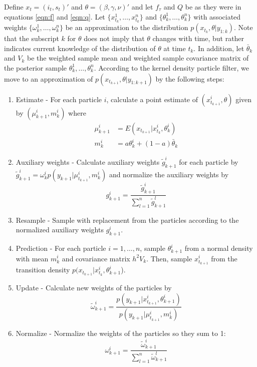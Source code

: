 \documentclass{article}
\begin{document}
Define $x_t = (i_t,s_t)'$ and $\theta = (\beta,\gamma,\nu)'$ and let $f_\tau$ and $Q$ be as they were in equations \eqref{eqn:f} and \eqref{eqn:q}.  Let $\{x_{t_k}^1,\ldots,x_{t_k}^n\}$ and $\{\theta_k^1,\ldots,\theta_k^n\}$ with associated weights $\{\omega_k^1,\ldots,\omega_k^n\}$ be an approximation to the distribution $p(x_{t_k},\theta|y_{1:k})$.  Note that the subscript $k$ for $\theta$ does not imply that $\theta$ changes with time, but rather indicates current knowledge of the distribution of $\theta$ at time $t_k$.  In addition, let $\bar{\theta}_k$ and $V_k$ be the weighted sample mean and weighted sample covariance matrix of the posterior sample ${\theta_k^1,\ldots,\theta_k^n}$.  According to the kernel density particle filter, we move to an approximation of $p(x_{t_{k+1}},\theta|y_{1:{k+1}})$ by the following steps:

\begin{enumerate}
\item Estimate - For each particle $i$, calculate a point estimate of $(x_{t_{k+1}}^i,\theta)$ given by $(\mu_{k+1}^i,m_k^i)$ where
    \begin{align*}
    \mu_{k+1}^i &= E(x_{t_{k+1}}|x_{t_k}^i,\theta_k^i) \\
    m_k^i &= a\theta_k^i + (1-a)\bar{\theta}_k
    \end{align*}
\item Auxiliary weights - Calculate auxiliary weights $\tilde{g}_{k+1}^i$ for each particle by $\tilde{g}_{k+1}^i = \omega_k^i p(y_{k+1}|\mu_{t_{k+1}}^i,m_k^i)$ and normalize the auxiliary weights by \[g_{k+1}^i = \frac{\tilde{g}_{k+1}^i}{\sum_{l=1}^n \tilde{g}_{k+1}^l}\]
\item Resample - Sample with replacement from the particles according to the normalized auxiliary weights $g_{k+1}^i$.
\item Prediction - For each particle $i = {1,\ldots,n}$, sample $\theta_{k+1}^i$ from a normal density with mean $m_k^i$ and covariance matrix $h^2V_k$.  Then, sample $x_{t_{k+1}}^i$ from the transition density $p(x_{t_{k+1}}|x_{t_k}^i,\theta_{k+1}^i$).
\item Update - Calculate new weights of the particles by \[\tilde{\omega}_{k+1}^i = \frac{p(y_{k+1}|x_{t_{k+1}}^i,\theta_{k+1}^i)}{p(y_{k+1}|\mu_{t_{k+1}}^i,m_k^i)}\]
\item Normalize - Normalize the weights of the particles so they sum to 1: \[\omega_{k+1}^i = \frac{\tilde{\omega}_{k+1}^i}{\sum_{l=1}^n \tilde{\omega}_{k+1}^l}\]
\end{enumerate}
\end{document}
